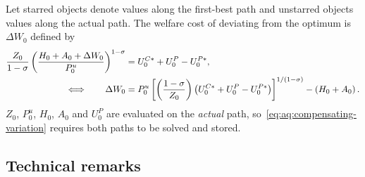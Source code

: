  Let starred objects denote values along the first-best path and unstarred objects values along the actual path. The welfare cost of deviating from the optimum is $\Delta W_0$ defined by
\begin{align}
\frac{Z_0}{1-\sigma}\left(\frac{H_0+A_0+\Delta W_0}{P^u_0}\right)^{1-\sigma}
&= U^{C*}_0+U^P_0-U^{P*}_0,
\notag \\
\Longleftrightarrow\qquad
\Delta W_0 &= P^u_0\left[\left(\frac{1-\sigma}{Z_0}\right)\left(U^{C*}_0+U^P_0-U^{P*}_0\right)\right]^{1/\left(1-\sigma\right)}-\left(H_0+A_0\right).
\label{eq:aq:compensating-variation}
\end{align}
$Z_0$, $P^u_0$, $H_0$, $A_0$ and $U^P_0$ are evaluated on the \emph{actual} path, so~\eqref{eq:aq:compensating-variation} requires both paths to be solved and stored.

\subsection{Technical remarks}
\label{subsec:aq:remarks}

